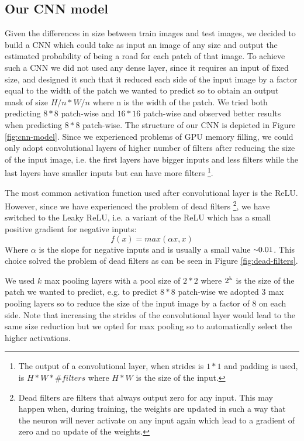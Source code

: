 \documentclass[10pt,conference,compsocconf]{IEEEtran}
\begin{document}
\subsection{Our CNN model}
Given the differences in size between train images and test images, we decided to build a CNN which could take as input an image of any size and output the estimated probability of being a road for each patch of that image. To achieve such a CNN we did not used any dense layer, since it requires an input of fixed size, and designed it such that it reduced each side of the input image by a factor equal to the width of the patch we wanted to predict so to obtain an output mask of size $H/n*W/n$ where n is the width of the patch. We tried both predicting $8*8$ patch-wise and $16*16$ patch-wise and observed better results when predicting $8*8$ patch-wise. The structure of our CNN is depicted in Figure \ref{fig:cnn-model}. Since we experienced problems of GPU memory filling, we could only adopt convolutional layers of higher number of filters after reducing the size of the input image, i.e. the first layers have bigger inputs and less filters while the last layers have smaller inputs but can have more filters \footnote{The output of a convolutional layer, when strides is $1*1$ and padding is used, is $H * W * \#filters$ where $H*W$ is the size of the input.}.

The most common activation function used after convolutional layer is the ReLU. However, since we have experienced the problem of dead filters \footnote{Dead filters are filters that always output zero for any input. This may happen when, during training, the weights are updated in such a way that the neuron will never activate on any input again which lead to a gradient of zero and no update of the weights.}, we have switched to the Leaky ReLU, i.e. a variant of the ReLU which has a small positive gradient for negative inputs:
$$f(x)=max(\alpha x, x)$$
Where $\alpha$ is the slope for negative inputs and is usually a small value ${\raise.17ex\hbox{$\scriptstyle\sim$}}0.01$.
This choice solved the problem of dead filters as can be seen in Figure \ref{fig:dead-filters}.

We used $k$ max pooling layers with a pool size of $2*2$ where $2\textsuperscript{k}$ is the size of the patch we wanted to predict, e.g. to predict $8*8$ patch-wise we adopted 3 max pooling layers so to reduce the size of the input image by a factor of 8 on each side. Note that increasing the strides of the convolutional layer would lead to the same size reduction but we opted for max pooling so to automatically select the higher activations.
\end{document}
